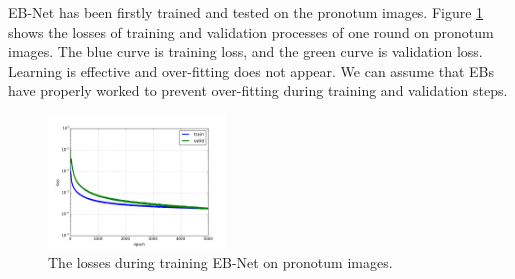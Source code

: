 \documentclass[review]{elsarticle}
\begin{document}


EB-Net has been firstly trained and tested on the pronotum images. Figure \ref{figdlosses} shows the losses of training and validation processes of one round on pronotum images. The blue curve is training loss, and the green curve is validation loss. Learning is effective and over-fitting does not appear. We can assume that EBs have properly worked to prevent over-fitting during training and validation steps.

\begin{figure}[h!]
    \centering
	\includegraphics[width=0.42\textwidth]{./images/loss_v16}
    \caption{The losses during training EB-Net on pronotum images.}
    \label{figdlosses}
\end{figure}
\end{document}
